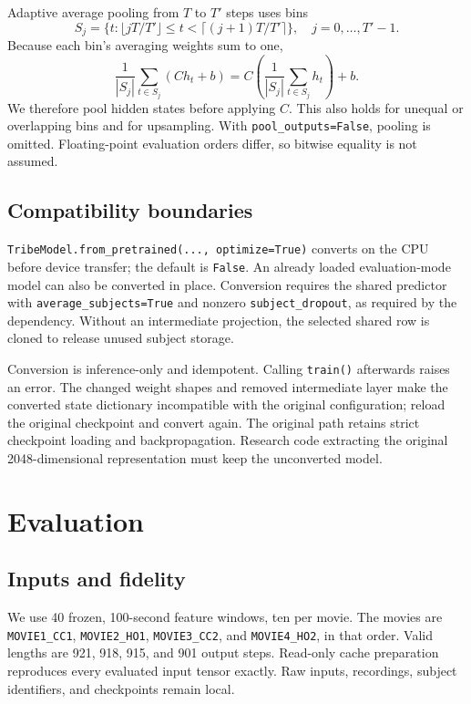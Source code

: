\documentclass[10pt]{article}
\begin{document}
Adaptive average pooling from $T$ to $T'$ steps uses bins~\cite{pooling}
\begin{equation}
S_j=\{t:\lfloor jT/T'\rfloor\leq t<\lceil(j+1)T/T'\rceil\},
\quad j=0,\ldots,T'-1.
\end{equation}
Because each bin's averaging weights sum to one,
\begin{equation}
\frac{1}{|S_j|}\sum_{t\in S_j}(Ch_t+b)
=C\left(\frac{1}{|S_j|}\sum_{t\in S_j}h_t\right)+b.
\label{eq:pool}
\end{equation}
We therefore pool hidden states before applying $C$. This also holds for unequal
or overlapping bins and for upsampling. With \texttt{pool\_outputs=False},
pooling is omitted. Floating-point evaluation orders differ, so bitwise equality
is not assumed.

\subsection{Compatibility boundaries}
\texttt{TribeModel.from\_pretrained(..., optimize=True)} converts on the CPU
before device transfer; the default is \texttt{False}. An already loaded
evaluation-mode model can also be converted in place. Conversion requires the
shared predictor with \texttt{average\_subjects=True} and nonzero
\texttt{subject\_dropout}, as required by the dependency. Without an
intermediate projection, the selected shared row is cloned to release unused
subject storage.

Conversion is inference-only and idempotent. Calling \texttt{train()} afterwards
raises an error. The changed weight shapes and removed intermediate layer make
the converted state dictionary incompatible with the original configuration;
reload the original checkpoint and convert again. The original path retains
strict checkpoint loading and backpropagation. Research code extracting the
original 2048-dimensional representation must keep the unconverted model.

\section{Evaluation}
\subsection{Inputs and fidelity}
We use 40 frozen, 100-second feature windows, ten per movie. The movies are
\texttt{MOVIE1\_CC1}, \texttt{MOVIE2\_HO1}, \texttt{MOVIE3\_CC2}, and
\texttt{MOVIE4\_HO2}, in that order. Valid lengths are 921, 918, 915, and 901
output steps. Read-only cache preparation reproduces every evaluated input tensor
exactly. Raw inputs, recordings, subject identifiers, and checkpoints remain local.
\end{document}
